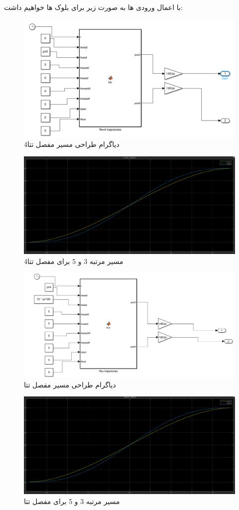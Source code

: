با اعمال ورودی ها به صورت زیر برای بلوک ها خواهیم داشت:
\begin{figure}[H]
	\centering
	\includegraphics[width=0.7\linewidth]{../img/13}
	\caption{دیاگرام طراحی مسیر مفصل تتا4}
	\label{fig:13}
\end{figure}
\begin{figure}[H]
	\centering
	\includegraphics[width=1\linewidth]{../img/16}
	\caption{مسیر مرتبه 3 و 5 برای مفصل تتا4}
	\label{fig:16}
\end{figure}
\begin{figure}[H]
	\centering
	\includegraphics[width=0.7\linewidth]{../img/14}
	\caption{دیاگرام طراحی مسیر مفصل تتا}
	\label{fig:14}
\end{figure}
\begin{figure}
	\centering
	\includegraphics[width=1\linewidth]{../img/17}
	\caption{مسیر مرتبه 3 و 5 برای مفصل تتا}
	\label{fig:17}
\end{figure}
